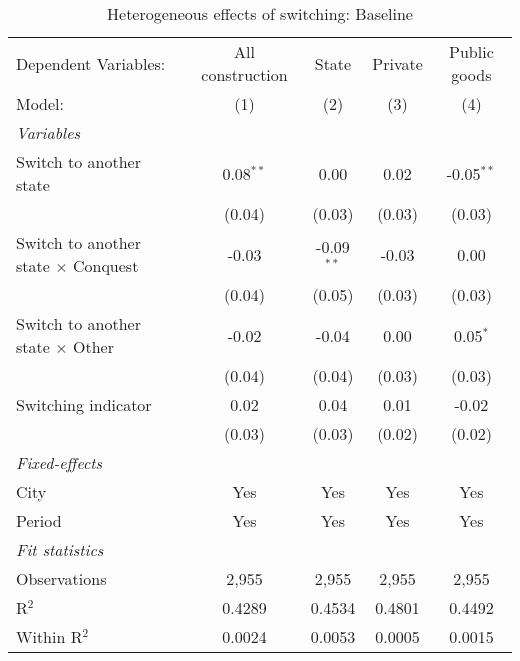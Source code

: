 \begin{table}[htbp]
   \caption{\label{tab:baseline_100y} Heterogeneous effects of switching: Baseline}
   \centering
   \begin{tabular}{lcccc}
      \tabularnewline \midrule \midrule
      Dependent Variables:                       & All construction & State        & Private & Public goods\\  
      Model:                                     & (1)              & (2)          & (3)     & (4)\\  
      \midrule
      \emph{Variables}\\
      Switch to another state                    & 0.08$^{**}$      & 0.00         & 0.02    & -0.05$^{**}$\\   
                                                 & (0.04)           & (0.03)       & (0.03)  & (0.03)\\   
      Switch to another state $\times$ Conquest  & -0.03            & -0.09$^{**}$ & -0.03   & 0.00\\   
                                                 & (0.04)           & (0.05)       & (0.03)  & (0.03)\\   
      Switch to another state $\times$ Other     & -0.02            & -0.04        & 0.00    & 0.05$^{*}$\\   
                                                 & (0.04)           & (0.04)       & (0.03)  & (0.03)\\   
      Switching indicator                        & 0.02             & 0.04         & 0.01    & -0.02\\   
                                                 & (0.03)           & (0.03)       & (0.02)  & (0.02)\\   
      \midrule
      \emph{Fixed-effects}\\
      City                                       & Yes              & Yes          & Yes     & Yes\\  
      Period                                     & Yes              & Yes          & Yes     & Yes\\  
      \midrule
      \emph{Fit statistics}\\
      Observations                               & 2,955            & 2,955        & 2,955   & 2,955\\  
      R$^2$                                      & 0.4289           & 0.4534       & 0.4801  & 0.4492\\  
      Within R$^2$                               & 0.0024           & 0.0053       & 0.0005  & 0.0015\\  
      \midrule \midrule
      

\end{tabular}
\end{table}
